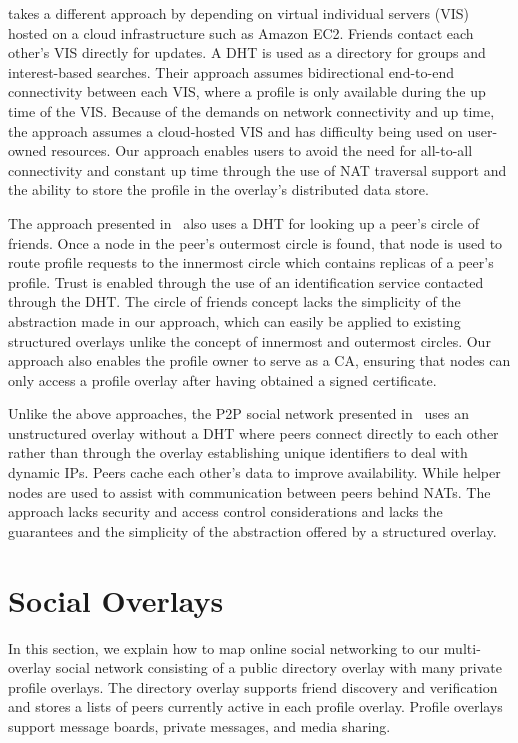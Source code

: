 \documentclass[letterpaper,twocolumn,10pt]{article}
\begin{document}
\cite{vis-a-vis} takes a different approach by depending on virtual individual
servers (VIS) hosted on a cloud infrastructure such as Amazon EC2. Friends
contact each other's VIS directly for updates.  A DHT is used as a directory for
groups and interest-based searches. Their approach assumes bidirectional
end-to-end connectivity between each VIS, where a profile is only available
during the up time of the VIS.  Because of the demands on network connectivity
and up time, the approach assumes a cloud-hosted VIS and has difficulty being used on user-owned resources.
Our approach enables users to avoid the need for all-to-all connectivity and
constant up time through the use of NAT traversal support and the
ability to store the profile in the overlay's distributed data store.

The approach presented in~\cite{matryoshka} also uses a DHT for looking up a peer's
 circle of friends.  Once a node in the peer's
outermost circle is found, that node is used to route profile requests to the
innermost circle which contains replicas of a peer's profile. Trust is enabled
through the use of an identification service contacted through the DHT.  The
circle of friends concept lacks the simplicity of the abstraction made in our
approach, which can easily be applied to existing structured overlays
unlike the concept of innermost and outermost circles.  Our approach
also enables the profile owner to serve as a CA, ensuring that nodes can only
access a profile overlay after having obtained a signed certificate.  

Unlike the above approaches, the P2P social network presented in~\cite{tribler-osn}
uses an unstructured overlay without a DHT where peers connect directly to
each other rather than through the overlay establishing unique identifiers to
deal with dynamic IPs.  Peers cache each other's data to improve availability.
While helper nodes are used to assist with communication between peers behind
NATs.  The approach lacks security and access control considerations and lacks the
guarantees and the simplicity of the abstraction offered by a structured overlay.

\section{Social Overlays}
\label{social_overlays}
In this section, we explain how to map online social networking to our
multi-overlay social network consisting of a public directory overlay with many
private profile overlays.  The directory overlay supports friend discovery and
verification and stores a lists of peers currently active in each profile
overlay.  Profile overlays support message boards, private messages, and media
sharing.
\end{document}
